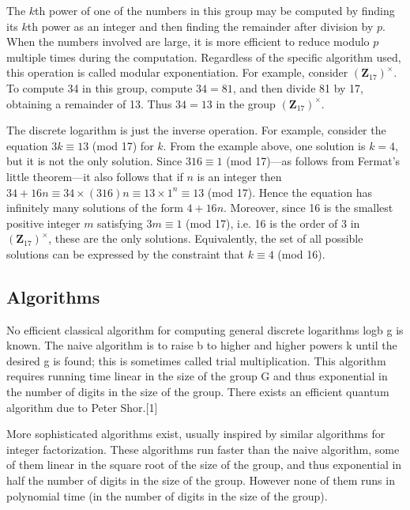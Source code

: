 \documentclass[oneside, a4paper, 11pt]{memoir}
\begin{document}
The $k$th power of one of the numbers in this group may be computed by finding its $k$th power as an integer and then finding the remainder after division by $p$. When the numbers involved are large, it is more efficient to reduce modulo $p$ multiple times during the computation. Regardless of the specific algorithm used, this operation is called modular exponentiation. For example, consider $(\mathbf{Z}_{17})^\times$. To compute 34 in this group, compute $34 = 81$, and then divide 81 by 17, obtaining a remainder of 13. Thus $34 = 13$ in the group $(\mathbf{Z}_{17})^\times$.

The discrete logarithm is just the inverse operation. For example, consider the equation $3k \equiv 13$ (mod 17) for $k$. From the example above, one solution is $k = 4$, but it is not the only solution. Since $316 \equiv 1$ (mod 17)---as follows from Fermat's little theorem---it also follows that if $n$ is an integer then $34+16n \equiv 34 \times (316)n \equiv 13 \times 1^n \equiv 13$ (mod 17). Hence the equation has infinitely many solutions of the form $4 + 16n$. Moreover, since 16 is the smallest positive integer $m$ satisfying $3m \equiv 1$ (mod 17), i.e. 16 is the order of 3 in $(\mathbf{Z}_{17})^\times$, these are the only solutions. Equivalently, the set of all possible solutions can be expressed by the constraint that $k \equiv 4$ (mod 16).

\subsection{Algorithms}
No efficient classical algorithm for computing general discrete logarithms logb g is known. The naive algorithm is to raise b to higher and higher powers k until the desired g is found; this is sometimes called trial multiplication. This algorithm requires running time linear in the size of the group G and thus exponential in the number of digits in the size of the group. There exists an efficient quantum algorithm due to Peter Shor.[1]

More sophisticated algorithms exist, usually inspired by similar algorithms for integer factorization. These algorithms run faster than the naive algorithm, some of them linear in the square root of the size of the group, and thus exponential in half the number of digits in the size of the group. However none of them runs in polynomial time (in the number of digits in the size of the group).

\end{document}
